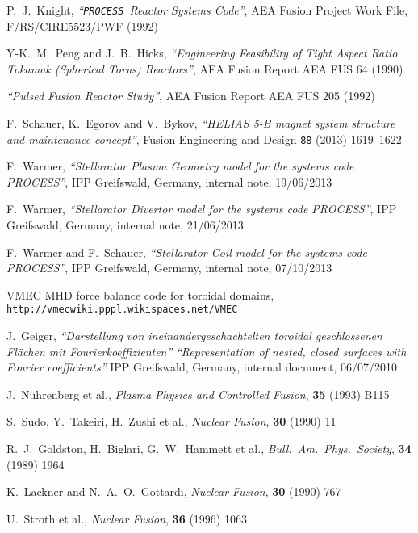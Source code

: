\documentclass[11pt,a4paper]{report}
\newcommand{\process}{\mbox{\texttt{PROCESS}}}
\begin{document}
\begin{thebibliography}{99}
P.\ J.\ Knight,
\textit{``\process\ Reactor Systems Code''},
AEA Fusion Project Work File, F/RS/CIRE5523/PWF
(1992)

Y-K.\ M.\ Peng and J.\ B.\ Hicks,
\textit{``Engineering Feasibility of Tight Aspect Ratio Tokamak
(Spherical Torus) Reactors''},
AEA Fusion Report AEA FUS 64 (1990)

\textit{``Pulsed Fusion Reactor Study''},
AEA Fusion Report AEA FUS 205
(1992)

F.\ Schauer, K.\ Egorov and V.\ Bykov,
\textit{``HELIAS 5-B magnet system structure and maintenance concept''},
Fusion Engineering and Design \texttt{88} (2013) 1619--1622

F.\ Warmer,
\textit{``Stellarator Plasma Geometry model for the systems code PROCESS''},
IPP Greifswald, Germany, internal note, 19/06/2013

F.\ Warmer,
\textit{``Stellarator Divertor model for the systems code PROCESS''},
IPP Greifswald, Germany, internal note, 21/06/2013

F.\ Warmer and F.\ Schauer,
\textit{``Stellarator Coil model for the systems code PROCESS''},
IPP Greifswald, Germany, internal note, 07/10/2013

VMEC MHD force balance code for toroidal domains,
\texttt{http://vmecwiki.pppl.wikispaces.net/VMEC}

J.\ Geiger,
\textit{``Darstellung von ineinandergeschachtelten toroidal geschlossenen
  Fl\"{a}chen mit Fourierkoeffizienten''} \textit{``Representation of
  nested, closed surfaces with Fourier coefficients''}
IPP Greifswald, Germany, internal document, 06/07/2010

J.\ N\"{u}hrenberg et al., \textit{Plasma Physics and Controlled Fusion},
\textbf{35} (1993) B115

S.\ Sudo, Y.\ Takeiri, H.\ Zushi et al., \textit{Nuclear Fusion}, \textbf{30} (1990)
11

R.\ J.\ Goldston, H.\ Biglari, G.\ W.\ Hammett et al.,
\textit{Bull.\ Am.\ Phys.\ Society}, \textbf{34} (1989) 1964

K.\ Lackner and N.\ A.\ O.\ Gottardi,
\textit{Nuclear Fusion}, \textbf{30} (1990) 767

U.\ Stroth et al.,
\textit{Nuclear Fusion}, \textbf{36} (1996) 1063


\end{thebibliography}
\end{document}
